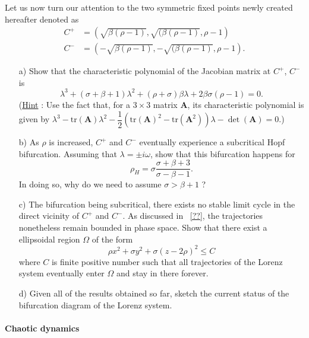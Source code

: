 \begin{problem}
  Let us now turn our attention to the two symmetric fixed points newly created hereafter denoted as
  \[
  \begin{aligned}
    C^+ & = (\sqrt{\beta(\rho -1)}, \sqrt{(\beta(\rho-1)}, \rho-1) \\
    C^- & = (-\sqrt{\beta(\rho -1)}, -\sqrt{(\beta(\rho-1)}, \rho-1).
  \end{aligned}
  \]

  \begin{enumerate}
  \item[a)] Show that the characteristic polynomial of the Jacobian matrix at $C^+$, $C^-$ is
    \[
    \lambda^3 + \left( \sigma + \beta + 1 \right) \lambda^2 + \left( \rho + \sigma \right) \beta \lambda + 2 \beta \sigma( \rho - 1) = 0.
    \]
    (\underline{Hint} : Use the fact that, for a $3 \times 3$ matrix $\bm{A}$, its characteristic polynomial is given by $\lambda^3 - \text{tr}(\bm{A})\lambda^2 - \dfrac{1}{2}\left( \text{tr}(\bm{A})^2 - \text{tr}(\bm{A}^2) \right) \lambda - \det(\bm{A}) = 0$.)

  \item[b)] As $\rho$ is increased, $C^+$ and $C^-$ eventually experience a subcritical Hopf bifurcation.
    Assuming that $\lambda = \pm i \omega$, show that this bifurcation happens for
    \[
    \rho_H = \sigma \dfrac{\sigma + \beta + 3}{\sigma - \beta - 1}.
    \]
    In doing so, why do we need to assume $\sigma > \beta + 1$ ?

  \item[c)] The bifurcation being subcritical, there exists no stable limit cycle in the direct vicinity of $C^+$ and $C^-$.
    As discussed in \textsection~\ref{??}, the trajectories nonetheless remain bounded in phase space.
    Show that there exist a ellipsoidal region $\Omega$ of the form
    \[
    \rho x^2 + \sigma y^2 + \sigma(z - 2\rho)^2 \leq C
    \]
    where $C$ is finite positive number such that all trajectories of the Lorenz system eventually enter $\Omega$ and stay in there forever.

  \item[d)] Given all of the results obtained so far, sketch the current status of the bifurcation diagram of the Lorenz system.
  \end{enumerate}

  \paragraph{Chaotic dynamics}


\end{problem}
